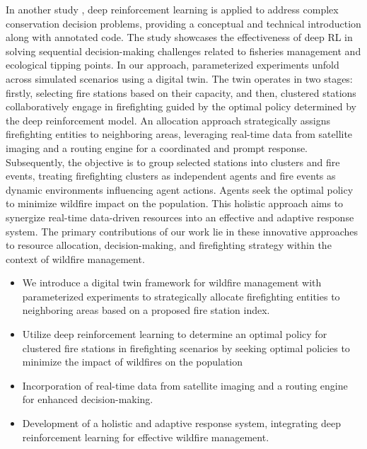 \documentclass{scspaperproc}
\theoremstyle{scsthe}
\begin{document}
In another study \cite{noauthor_deep_nodate}, deep reinforcement learning is applied to address complex conservation decision problems, providing a conceptual and technical introduction along with annotated code. The study showcases the effectiveness of deep RL in solving sequential decision-making challenges related to fisheries management and ecological tipping points.
In our approach, parameterized experiments unfold across simulated scenarios using a digital twin. The twin operates in two stages: firstly, selecting fire stations based on their capacity, and then, clustered stations collaboratively engage in firefighting guided by the optimal policy determined by the deep reinforcement model. An allocation approach strategically assigns firefighting entities to neighboring areas, leveraging real-time data from satellite imaging and a routing engine for a coordinated and prompt response.
Subsequently, the objective is to group selected stations into clusters and fire events, treating firefighting clusters as independent agents and fire events as dynamic environments influencing agent actions. Agents seek the optimal policy to minimize wildfire impact on the population. This holistic approach aims to synergize real-time data-driven resources into an effective and adaptive response system. The primary contributions of our work lie in these innovative approaches to resource allocation, decision-making, and firefighting strategy within the context of wildfire management.



\begin{itemize}
    \item We introduce a digital twin framework for wildfire management with parameterized experiments to strategically allocate firefighting entities to neighboring areas based on a proposed fire station index.

    \item Utilize deep reinforcement learning to determine an optimal policy for clustered fire stations in firefighting scenarios by seeking optimal policies to minimize the impact of wildfires on the population

    \item Incorporation of real-time data from satellite imaging and a routing engine for enhanced decision-making.
    
    \item Development of a holistic and adaptive response system, integrating deep reinforcement learning for effective wildfire management.
    



    
\end{itemize}
\end{document}

